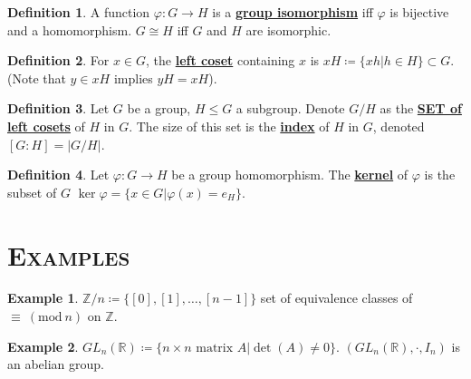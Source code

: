 \documentclass{article}
\newcommand{\Z}{\mathbb{Z}}
\newcommand{\R}{\mathbb{R}}
\newcommand{\coleq}{\coloneqq}
\newcommand{\define}[1]{\textbf{\underline{#1}}}
\newcommand{\func}[3]{#1: #2 \to #3}
\renewcommand{\mod}[1]{\ (\mathrm{mod}\ #1)}
\theoremstyle{definition}
\newtheorem*{defn}{Definition}
\newtheorem*{ex}{Example}
\theoremstyle{remark}
\begin{document}
{        \begin{defn}
            A function $\func{\varphi}{G}{H}$ is a \define{group isomorphism} iff $\varphi$ is bijective and a homomorphism. $G\cong H$ iff $G$ and $H$ are isomorphic.
        \end{defn}
        
        \begin{defn}
            For $x \in G$, the \define{left coset} containing $x$ is $xH\coleq\{xh|h\in H\} \subset G$. (Note that $y \in xH$ implies $yH=xH$). 
        \end{defn}
        
        \begin{defn}
            Let $G$ be a group, $H\leq G$ a subgroup. Denote $G/H$ as the \define{SET of left cosets} of $H$ in $G$. The size of this set is the \define{index} of $H$ in $G$, denoted $[G:H]=|G/H|$.
        \end{defn}
        
        \begin{defn}
            Let $\func{\varphi}{G}{H}$ be a group homomorphism. The \define{kernel} of $\varphi$ is the subset of $G$ $\ker\varphi=\{x \in G|\varphi(x)=e_H\}$.
        \end{defn}
    }
    \noindent\section*{\textbf{\textsc{Examples}}}{
        \begin{ex}
            $\Z/n\coleq \{[0],[1],\ldots,[n-1]\}$ set of equivalence classes of $\equiv \mod n$ on $\Z$. 
        \end{ex}
        
        \begin{ex}
            $GL_n(\R)\coleq\{\text{$n\times n$ matrix $A$}|\det(A)\neq 0\}$. $(GL_n(\R),\cdot,I_n)$ is an abelian group.
        \end{ex}
    }
\end{document}
